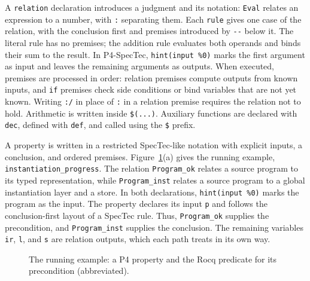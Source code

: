 A \texttt{relation} declaration introduces a judgment and its notation:
\texttt{Eval} relates an expression to a number, with \texttt{:} separating
them.
Each \texttt{rule} gives one case of the relation, with the conclusion first
and premises introduced by \texttt{-{}-} below it.
The literal rule has no premises; the addition rule evaluates both operands
and binds their sum to the result.
In P4-SpecTec, \texttt{hint(input \%0)} marks the first argument as input and
leaves the remaining arguments as outputs.
When executed, premises are processed in order: relation premises compute
outputs from known inputs, and \texttt{if} premises check side conditions or
bind variables that are not yet known.
Writing \texttt{:/} in place of \texttt{:} in a relation premise requires the
relation not to hold.
Arithmetic is written inside \texttt{\$(...)}.
Auxiliary functions are declared with \texttt{dec}, defined with \texttt{def},
and called using the \texttt{\$} prefix.

A property is written in a restricted SpecTec-like notation with explicit
inputs, a conclusion, and ordered premises.
Figure~\ref{fig:instantiation-property}(a) gives the running example,
\texttt{instantiation\_progress}.
The relation \texttt{Program\_ok} relates a source program to its typed
representation, while \texttt{Program\_inst} relates a source program to a
global instantiation layer and a store.
In both declarations, \texttt{hint(input \%0)} marks the program as the
input.
The property declares its input \texttt{p} and follows the conclusion-first
layout of a SpecTec rule.
Thus, \texttt{Program\_ok} supplies the precondition, and
\texttt{Program\_inst} supplies the conclusion.
The remaining variables \texttt{ir}, \texttt{l}, and \texttt{s} are relation
outputs, which each path treats in its own way.

\begin{figure}[t]
  \centering
  
  \caption{The running example: a P4 property and the Rocq predicate for its
    precondition (abbreviated).}
  \label{fig:instantiation-property}
\end{figure}

